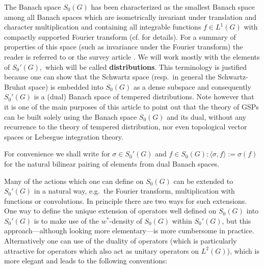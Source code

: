 \documentclass[graybox]{svmult}
\begin{document}
The Banach space ${S_{0}(G)}$
has been characterized as the smallest Banach space among all Banach
spaces which are isometrically invariant under translation and character
multiplication and containing all integrable functions $f\in L^{1}(G)$
with compactly supported Fourier transform (cf.  \cite{fe81-2} for
details).  For a summary of properties of this space (such as invariance
under the Fourier transform) the reader is referred to \cite{fe81-2} or
the survey article \cite{fe89-2}.  We will work mostly with the elements
of ${S_0{ '}(G)},$ which will be called \textbf{distributions}.
This terminology is justified because one can show that the
Schwartz space (resp.\ in general the Schwartz-Bruhat space)
is embedded into ${S_{0}(G)}$ as a dense subspace and consequently
${S_0{ '}(G)}$ is a (dual) Banach space of tempered distributions.
Note however that it is one of the main purposes of this article
to point out that the theory of GSPs can be built solely using
the Banach space ${S_{0}(G)}$ and its dual, without any recurrence
to the theory of tempered distribution, nor even topological
vector spaces or Lebesgue integration theory.

For convenience we shall write for $\sigma \in {S_0{ '}(G)}$ and
$f\in {S_{0}(G)}: \langle \sigma ,f\rangle := \sigma (f)$ for
the natural bilinear pairing of elements from dual Banach spaces.

Many of the actions which one can define on ${S_{0}(G)}$
can be extended to ${S_0{ '}(G)}$ in a natural way, e.g.\
the Fourier transform, multiplication with functions or
convolutions. In principle there are two ways for such
extensions. One way to define the unique extension
of operators well defined on ${S_{0}(G)}$ into ${S_0{ '}(G)}$
is to make use of the  ${w}^{\ast}$-density
of ${S_{0}(G)}$ within ${S_0{ '}(G)}$, but this approach---although
looking more elementary---is more cumbersome in practice.
Alternatively one can use of the duality of operators
(which is particularly attractive for operators which also
act as unitary operators on $L^2(G)$), which is more elegant
and leads to the following conventions:
%

\end{document}
